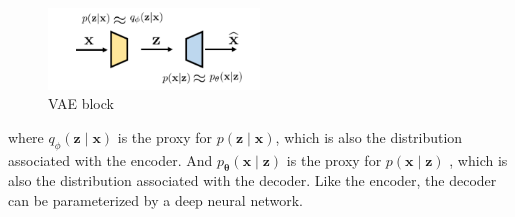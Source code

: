 \begin{figure}[H]
    \centering
    \includegraphics[width=0.5\textwidth]{./pics/VAE.png} %
    \caption{VAE block}
\end{figure}
where $q_{\phi}(\mathbf{z} \mid \mathbf{x})$ is the proxy for  $p(\mathbf{z} \mid \mathbf{x})$, which is also the distribution associated with the encoder.  
And $p_{\boldsymbol{\theta}}(\mathbf{x} \mid \mathbf{z})$ is the proxy for  $p(\mathbf{x} \mid \mathbf{z})$ , which is also the distribution associated with the decoder. 
Like the encoder, the decoder can be parameterized by a deep neural network. 

